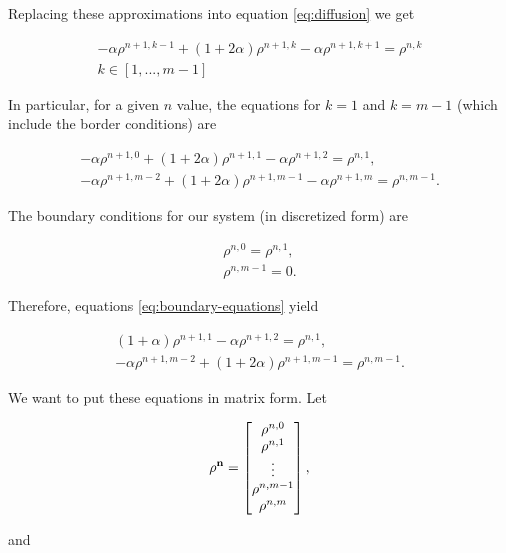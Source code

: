 Replacing these approximations into equation \ref{eq:diffusion} we get

\begin{align}
    -\alpha \rho^{n+1,k-1} + ( 1 + 2\alpha ) \rho^{n+1,k} -\alpha \rho^{n+1,k+1} =  \rho^{n,k}\\
    k \in [1, ... , m-1]
    \label{eq:equations-n}
\end{align}

In particular, for a given $n$ value,  the equations for $k=1$ and $k=m-1$ (which include the border conditions) are

\begin{align}
    -\alpha \rho^{n+1,0} + ( 1 + 2\alpha ) \rho^{n+1,1} -\alpha \rho^{n+1,2} = \rho^{n,1},\\
    -\alpha \rho^{n+1,m-2} + ( 1 + 2\alpha ) \rho^{n+1,m-1} -\alpha \rho^{n+1,m} = \rho^{n,m-1}.
    \label{eq:boundary-equations}
\end{align}

The boundary conditions for our system (in discretized form) are

\begin{align}
    \rho^{n, 0} = \rho^{n, 1}, \\
    \rho^{n, m-1} = 0.
\end{align}

Therefore, equations \ref{eq:boundary-equations} yield

\begin{align}
    ( 1 + \alpha ) \rho^{n+1,1} -\alpha \rho^{n+1,2} = \rho^{n,1},\\
    -\alpha \rho^{n+1,m-2} + ( 1 + 2\alpha ) \rho^{n+1,m-1} = \rho^{n,m-1}.
\end{align}

We want to put these equations in matrix form. Let 

\begin{align}
    \bf{\rho^n} = \begin{bmatrix}
                    \rho^{n, 0} \\
                    \rho^{n, 1} \\
                    \vdots \\
                    \rho^{n, m-1} \\
                    \rho^{n, m} \\
                    \end{bmatrix},
\end{align}

and 

